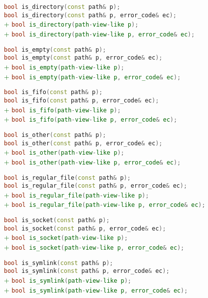 \documentclass[11pt]{article}
\newcommand{\code}[2][cpp]{\lstinline[language=#1,basicstyle=\small\ttfamily]{#2}}
\newcommand{\tsreplace}[3]{\textcolor{red}{\sout{#1}}#2\textcolor{darkgreen}{#3}}
\begin{document}
\tsreplace{}{  \code{bool is_directory(const path& p);}}{}\\
\tsreplace{}{  \code{bool is_directory(const path& p, error_code& ec);}}{}\\
\tsreplace{}{}{+ \code{bool is_directory(path-view-like p);}}\\
\tsreplace{}{}{+ \code{bool is_directory(path-view-like p, error_code& ec);}}

\tsreplace{}{ \code{bool is_empty(const path& p);}}{}\\
\tsreplace{}{ \code{bool is_empty(const path& p, error_code& ec);}}{}\\
\tsreplace{}{}{+ \code{bool is_empty(path-view-like p);}}\\
\tsreplace{}{}{+ \code{bool is_empty(path-view-like p, error_code& ec);}}

\tsreplace{}{  \code{bool is_fifo(const path& p);}}{}\\
\tsreplace{}{  \code{bool is_fifo(const path& p, error_code& ec);}}{}\\
\tsreplace{}{}{+ \code{bool is_fifo(path-view-like p);}}\\
\tsreplace{}{}{+ \code{bool is_fifo(path-view-like p, error_code& ec);}}

\tsreplace{}{  \code{bool is_other(const path& p);}}{}\\
\tsreplace{}{  \code{bool is_other(const path& p, error_code& ec);}}{}\\
\tsreplace{}{}{+ \code{bool is_other(path-view-like p);}}\\
\tsreplace{}{}{+ \code{bool is_other(path-view-like p, error_code& ec);}}

\tsreplace{}{  \code{bool is_regular_file(const path& p);}}{}\\
\tsreplace{}{  \code{bool is_regular_file(const path& p, error_code& ec);}}{}\\
\tsreplace{}{}{+ \code{bool is_regular_file(path-view-like p);}}\\
\tsreplace{}{}{+ \code{bool is_regular_file(path-view-like p, error_code& ec);}}

\tsreplace{}{  \code{bool is_socket(const path& p);}}{}\\
\tsreplace{}{  \code{bool is_socket(const path& p, error_code& ec);}}{}\\
\tsreplace{}{}{+ \code{bool is_socket(path-view-like p);}}\\
\tsreplace{}{}{+ \code{bool is_socket(path-view-like p, error_code& ec);}}

\tsreplace{}{  \code{bool is_symlink(const path& p);}}{}\\
\tsreplace{}{  \code{bool is_symlink(const path& p, error_code& ec);}}{}\\
\tsreplace{}{}{+ \code{bool is_symlink(path-view-like p);}}\\
\tsreplace{}{}{+ \code{bool is_symlink(path-view-like p, error_code& ec);}}
\end{document}
